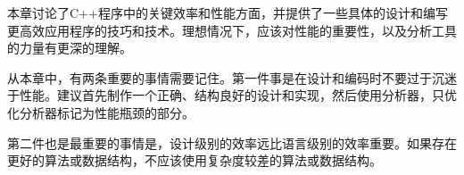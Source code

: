 本章讨论了C++程序中的关键效率和性能方面，并提供了一些具体的设计和编写更高效应用程序的技巧和技术。理想情况下，应该对性能的重要性，以及分析工具的力量有更深的理解。

从本章中，有两条重要的事情需要记住。第一件事是在设计和编码时不要过于沉迷于性能。建议首先制作一个正确、结构良好的设计和实现，然后使用分析器，只优化分析器标记为性能瓶颈的部分。

第二件也是最重要的事情是，设计级别的效率远比语言级别的效率重要。如果存在更好的算法或数据结构，不应该使用复杂度较差的算法或数据结构。
